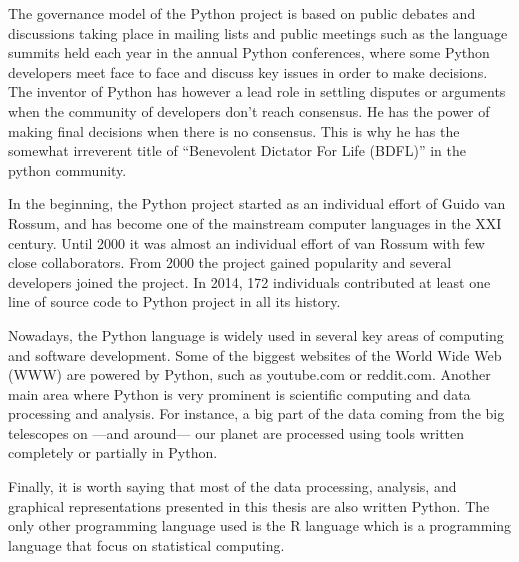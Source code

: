The governance model of the Python project is based on public debates and discussions taking place in mailing lists and public meetings such as the language summits held each year in the annual Python conferences, where some Python developers meet face to face and discuss key issues in order to make decisions. The inventor of Python has however a lead role in settling disputes or arguments when the community of developers don't reach consensus. He has the power of making final decisions when there is no consensus. This is why he has the somewhat irreverent title of ``Benevolent Dictator For Life (BDFL)'' in the python community. 

In the beginning, the Python project started as an individual effort of Guido van Rossum, and has become one of the mainstream computer languages in the XXI century. Until 2000 it was almost an individual effort of van Rossum with few close collaborators. From 2000 the project gained popularity and several developers joined the project. In 2014, 172 individuals contributed at least one line of source code to Python project in all its history.

Nowadays, the Python language is widely used in several key areas of computing and software development. Some of the biggest websites of the World Wide Web (WWW) are powered by Python, such as youtube.com or reddit.com. Another main area where Python is very prominent is scientific computing and data processing and analysis. For instance, a big part of the data coming from the big telescopes on ---and around--- our planet are processed using tools written completely or partially in Python.

Finally, it is worth saying that most of the data processing, analysis, and graphical representations presented in this thesis are also written Python. The only other programming language used is the R language which is a programming language that focus on statistical computing.
